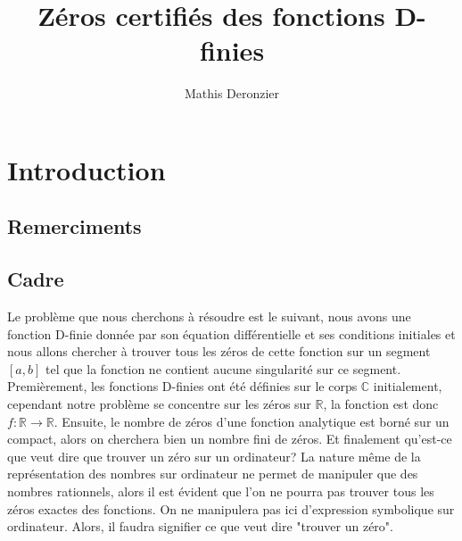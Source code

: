 \documentclass[a4paper,10.5pt]{article}
\title{Zéros certifiés des fonctions D-finies}
\author{Mathis Deronzier}
\date{}
\begin{document}
	
	\maketitle
	\renewcommand{\contentsname}{Sommaire}
	\newpage
	\tableofcontents
	\newpage
	\renewcommand {\algorithmicrequire } {\textbf{\textsc{Entrée(s):} } }
	\renewcommand {\algorithmicensure } {\textbf{\textsc{Sortie:} } }
	\renewcommand {\algorithmicwhile } {\textbf{Tant que} }
	\renewcommand {\algorithmicdo } {\textbf{faire} }
	\renewcommand {\algorithmicendwhile } {\textbf{fin du Tant que} }
	\renewcommand {\algorithmicif } {\textbf{Si} }
	\renewcommand {\algorithmicthen } {\textbf{alors} }
	\renewcommand {\algorithmicendif } {\textbf{fin du Si} }

	\renewcommand {\algorithmicelse } {\textbf{Sinon} }
	\renewcommand {\algorithmicreturn } {\textbf{Renvoyer} }

	\section{Introduction}
	\newtheorem{theorem}{Théorème}[section] 
	\newtheorem{proposition}{Proposition}
	\newtheorem{corollaire}{Corollaire}
	\newtheorem{definition}{Définition}
	\newtheorem{demonstration}{Démonstration}
	\subsection{Remerciments}
	\subsection{Cadre}
	
	Le problème que nous cherchons à résoudre est le suivant, nous avons une fonction D-finie donnée par son équation différentielle et ses conditions initiales et nous allons chercher à trouver tous les zéros de cette fonction sur un segment $[a,b]$ tel que la fonction ne contient aucune singularité sur ce segment. \\
	Premièrement, les fonctions D-finies ont été définies sur le corps $\mathbb{C}$ initialement, cependant notre problème se concentre sur les zéros sur $\mathbb{R}$, la fonction est donc $f: \mathbb{R} \rightarrow \mathbb{R}$.
	Ensuite, le nombre de zéros d'une fonction analytique est borné sur un compact, alors on cherchera bien un nombre fini de zéros.
	Et finalement qu'est-ce que veut dire que trouver un zéro sur un ordinateur? La nature même de la représentation des nombres sur ordinateur ne permet de manipuler que des nombres rationnels, alors il est évident que l'on ne pourra pas trouver tous les zéros exactes des fonctions. On ne manipulera pas ici d'expression symbolique sur ordinateur. Alors, il faudra signifier ce que veut dire "trouver un zéro".
	
\end{document}
